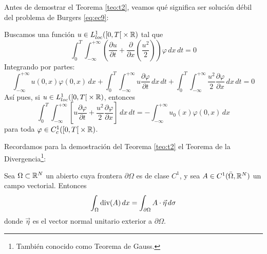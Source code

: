 Antes de demostrar el Teorema \ref{teo:t2}, veamos qué significa ser solución débil del problema de Burgers \eqref{eq:ec9}:

\begin{definicion}
    Buscamos una función $u \in L_{loc}^1(\left[0, T\right[ \times \mathbb{R})$ tal que
    $$\int_{0}^{T} \int_{-\infty}^{+\infty} \left( \dfrac{\partial u}{\partial t} + \dfrac{\partial}{\partial x} \left( \dfrac{u^2}{2} \right) \right) \varphi \,dx\,dt = 0$$
    Integrando por partes:
    $$\int_{-\infty}^{+\infty} u(0,x) \varphi(0,x)\,dx + \int_{0}^{T} \int_{-\infty}^{+\infty} u \dfrac{\partial \varphi}{\partial t}\,dx\,dt
    + \int_{0}^{T} \int_{-\infty}^{+\infty} \dfrac{u^2}{2} \dfrac{\partial \varphi}{\partial x}\,dx\,dt = 0$$
    Así pues, si $u \in L_{loc}^1(\left[0, T\right[ \times \mathbb{R})$, entonces 
    \begin{equation}\label{eq:ec15}
        \boxed{\int_{0}^{T} \int_{-\infty}^{+\infty} \left[ u \dfrac{\partial \varphi}{\partial t} + \dfrac{u^2}{2} \dfrac{\partial \varphi}{\partial x} \right]\,dx\,dt = - 
        \int_{-\infty}^{+\infty} u_0(x) \varphi(0,x)\,dx}
    \end{equation}
    para toda $\varphi \in C_c^1(\left[0, T\right[ \times \mathbb{R})$.
\end{definicion}

Recordamos para la demostración del Teorema \ref{teo:t2} el Teorema de la Divergencia\footnote{También conocido como Teorema de Gauss.}:

\begin{teo}[de la Divergencia]
    Sea $\Omega \subset \mathbb{R}^N$ un abierto cuya frontera $\partial \Omega$ es de clase $C^1$, y sea $A \in C^1(\bar{\Omega}, \mathbb{R}^N)$ un campo vectorial.
    Entonces
    $$\int_{\Omega} \text{div}(A)\,dx = \int_{\partial \Omega} A \cdot \vec{\eta} \, d \sigma$$
    donde $\vec{\eta}$ es el vector normal unitario exterior a $\partial \Omega$.
\end{teo}

